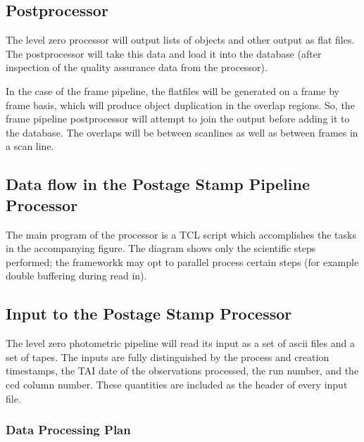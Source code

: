 \subsection{Postprocessor}

	The level zero processor will output lists of objects and other output
as flat files.  The postprocessor will take this data and load it into the
database (after inspection of the quality assurance data from the processor).

In the case of the frame pipeline, the flatfiles will be
generated on a frame by frame basis, which will produce object
duplication in the overlap regions. So, the frame pipeline postprocessor 
will attempt to join 
the output before adding it to the database.  The overlaps will be between
scanlines as well as between frames in a scan line.

\subsection{Data flow in the Postage Stamp Pipeline Processor}

	The main program of the processor is a TCL script which accomplishes
the tasks in the accompanying figure.  The diagram shows only the scientific
steps performed; the frameworkk may opt to parallel process certain steps
(for example double buffering during read in).

\textwidth
{}

\subsection{Input to the Postage Stamp Processor}

The level zero photometric pipeline will read its input as a set of ascii
files and a set of tapes.  The inputs are fully distinguished by the
process and creation timestamps, the TAI date of the observations
processed, the run number, and the ccd column number.  These quantities
are included as the header of every input file.

\subsubsection{Data Processing Plan}

